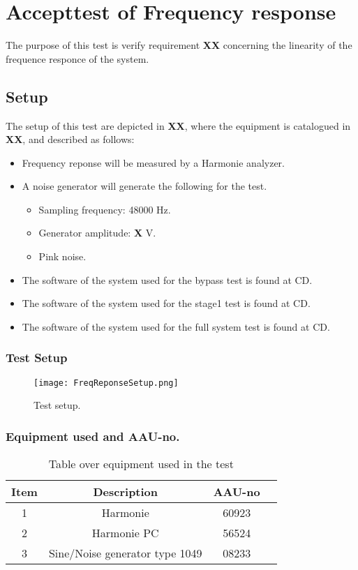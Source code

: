 \chapter{Accepttest of Frequency response}\label{app:journal_Frequency_Response}
The purpose of this test is verify requirement \textbf{XX} concerning the linearity of the frequence responce of the system.

\section{Setup}
The setup of this test are depicted in \textbf{XX}, where the equipment is catalogued in \textbf{XX}, and described as follows:

\begin{itemize}
\item Frequency reponse will be measured by a Harmonie analyzer.
\item A noise generator will generate the following for the test. 
\begin{itemize}
\item Sampling frequency: 48000 Hz.
\item Generator amplitude: \textbf{X} V.
\item Pink noise.
\end{itemize}
\item The software of the system used for the bypass test is found at CD. 
\item The software of the system used for the stage1 test is found at CD. 
\item The software of the system used for the full system test is found at CD. 
\end{itemize}


\subsection*{Test Setup}
\begin{figure}[H]
\centering
\texttt{[image: FreqReponseSetup.png]}
\label{fig:AcceptFreqResponse}
\caption{Test setup.}
\end{figure}

\subsection*{Equipment used and AAU-no.}

\begin{table}[H]
\centering
{}
\begin{tabular}{S[table-format=1]ccc} \toprule
    {Item} & {Description} & {AAU-no} \\       &  Harmonie  & 60923  \\ 
    2      &  Harmonie PC  & 56524  \\ 
    3      &  Sine/Noise generator type 1049  & 08233  \\  \bottomrule 
\end{tabular}
\caption{Table over equipment used in the test}
\label{tab:UsedEquipmentFreqResponse}
\end{table}
\vspace{-5mm}


